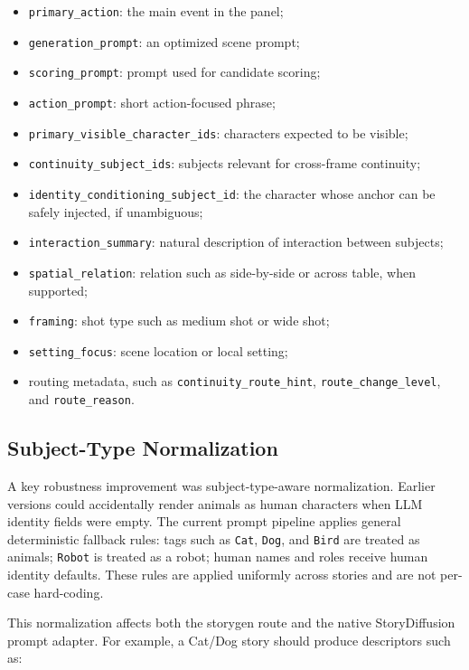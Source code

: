 \documentclass[11pt,a4paper]{article}
\begin{document}
\begin{itemize}[leftmargin=*]
    \item \texttt{primary\_action}: the main event in the panel;
    \item \texttt{generation\_prompt}: an optimized scene prompt;
    \item \texttt{scoring\_prompt}: prompt used for candidate scoring;
    \item \texttt{action\_prompt}: short action-focused phrase;
    \item \texttt{primary\_visible\_character\_ids}: characters expected to be visible;
    \item \texttt{continuity\_subject\_ids}: subjects relevant for cross-frame continuity;
    \item \texttt{identity\_conditioning\_subject\_id}: the character whose anchor can be safely injected, if unambiguous;
    \item \texttt{interaction\_summary}: natural description of interaction between subjects;
    \item \texttt{spatial\_relation}: relation such as side-by-side or across table, when supported;
    \item \texttt{framing}: shot type such as medium shot or wide shot;
    \item \texttt{setting\_focus}: scene location or local setting;
    \item routing metadata, such as \texttt{continuity\_route\_hint}, \texttt{route\_change\_level}, and \texttt{route\_reason}.
\end{itemize}

\subsection{Subject-Type Normalization}

A key robustness improvement was subject-type-aware normalization. Earlier versions could accidentally render animals as human characters when LLM identity fields were empty. The current prompt pipeline applies general deterministic fallback rules: tags such as \texttt{Cat}, \texttt{Dog}, and \texttt{Bird} are treated as animals; \texttt{Robot} is treated as a robot; human names and roles receive human identity defaults. These rules are applied uniformly across stories and are not per-case hard-coding.

This normalization affects both the storygen route and the native StoryDiffusion prompt adapter. For example, a Cat/Dog story should produce descriptors such as:
\end{document}
